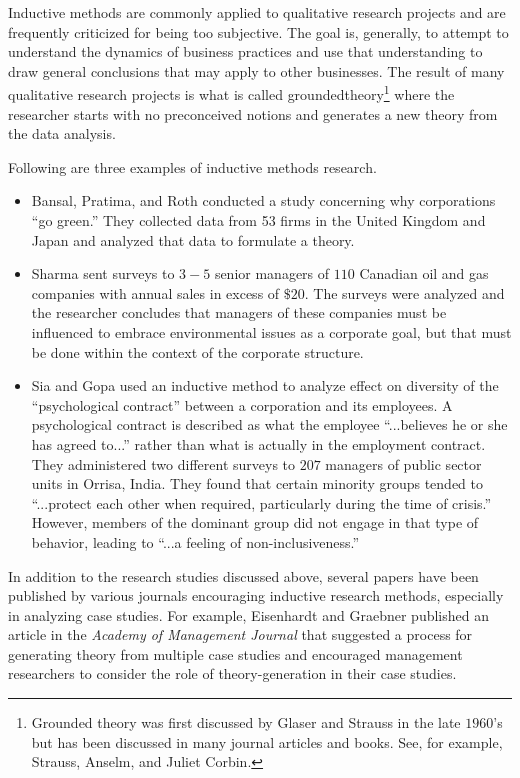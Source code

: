Inductive methods are commonly applied to qualitative research projects and are frequently criticized for being too subjective. The goal is, generally, to attempt to understand the dynamics of business practices and use that understanding to draw general conclusions that may apply to other businesses. The result of many qualitative research projects is what is called \gls{groundedtheory}\footnote{Grounded theory was first discussed by Glaser and Strauss in the late $ 1960 $'s but has been discussed in many journal articles and books. See, for example, Strauss, Anselm, and Juliet Corbin\cite{strauss1994grounded}.} where the researcher starts with no preconceived notions and generates a new theory from the data analysis.

Following are three examples of inductive methods research.

\begin{itemize}
	\item Bansal, Pratima, and Roth\cite{bansal2000companies} conducted a study concerning why corporations ``go green.'' They collected data from 53 firms in the United Kingdom and Japan and analyzed that data to formulate a theory.

	\item Sharma\cite{sharma2000managerial} sent surveys to $ 3-5 $ senior managers of $ 110 $ Canadian oil and gas companies with annual sales in excess of $ \$20 $. The surveys were analyzed and the researcher concludes that managers of these companies must be influenced to embrace environmental issues as a corporate goal, but that must be done within the context of the corporate structure.  

	\item Sia and Gopa\cite{sia2009employees} used an inductive method to analyze effect on diversity of the ``psychological contract'' between a corporation and its employees. A psychological contract is described as what the employee ``...believes he or she has agreed to...'' rather than what is actually in the employment contract. They administered two different surveys to $ 207 $ managers of public sector units in Orrisa, India. They found that certain minority groups tended to ``...protect each other when required, particularly during the time of crisis.'' However, members of the dominant group did not engage in that type of behavior, leading to ``...a feeling of non-inclusiveness.''

\end{itemize}

In addition to the research studies discussed above, several papers have been published by various journals encouraging inductive research methods, especially in analyzing case studies. For example, Eisenhardt and Graebner\cite{eisenhardt2007theory} published an article in the \textit{Academy of Management Journal} that suggested  a process for generating theory from multiple case studies and encouraged management researchers to consider the role of theory-generation in their case studies. 

